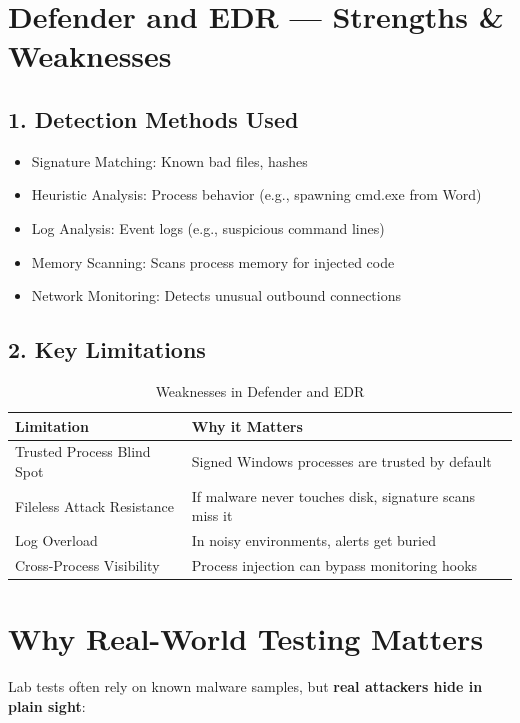 \section{Defender and EDR — Strengths \& Weaknesses}

\subsection{1. Detection Methods Used}
\begin{itemize}
    \item Signature Matching: Known bad files, hashes
    \item Heuristic Analysis: Process behavior (e.g., spawning cmd.exe from Word)
    \item Log Analysis: Event logs (e.g., suspicious command lines)
    \item Memory Scanning: Scans process memory for injected code
    \item Network Monitoring: Detects unusual outbound connections
\end{itemize}

\subsection{2. Key Limitations}
\begin{table}[H]
    \centering
    \begin{tabular}{|l|l|}
        \hline
        \textbf{Limitation} & \textbf{Why it Matters} \\
        \hline
        Trusted Process Blind Spot & Signed Windows processes are trusted by default \\
        Fileless Attack Resistance & If malware never touches disk, signature scans miss it \\
        Log Overload & In noisy environments, alerts get buried \\
        Cross-Process Visibility & Process injection can bypass monitoring hooks \\
        \hline
    \end{tabular}
    \caption{Weaknesses in Defender and EDR}
\end{table}

\section{Why Real-World Testing Matters}

Lab tests often rely on known malware samples, but \textbf{real attackers hide in plain sight}:

